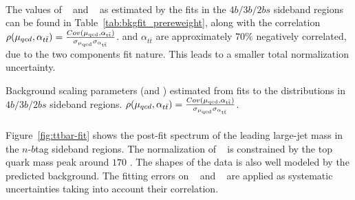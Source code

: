 \paragraph{}
The values of \muqcd~ and \alphatt~ as estimated by the fits in the $4b/3b/2bs$ sideband regions can be found in Table~\ref{tab:bkgfit_prereweight}, along with the correlation $\rho(\mu_{qcd},\alpha_{t\bar{t}}) = \frac{Cov(\rm \mu_{qcd},\rm \alpha_{\rm t\bar{t}})}{\rm \sigma_{\mu_{qcd}} \rm \sigma_{\alpha_{\rm t\bar{t}}} }$. 
\muqcd and $\alpha_{t\bar{t}}$ are approximately $70\%$ negatively correlated, due to the two components fit nature.
This leads to a smaller total normalization uncertainty.

\begin{table}[htbp!]
\begin{center}

\caption{Background scaling parameters (\muqcd and \alphatt) estimated from fits to the \mleadJ distributions in $4b/3b/2bs$ sideband regions. $\rho(\mu_{qcd},\alpha_{t\bar{t}}) = \frac{Cov(\rm \mu_{qcd},\rm \alpha_{\rm t\bar{t}})}{\rm \sigma_{\mu_{qcd}} \rm \sigma_{\alpha_{\rm t\bar{t}}} }$.}
\label{tab:bkgfit_prereweight}
\end{center}
\end{table}

\paragraph{}
Figure~\ref{fig:ttbar-fit} shows the post-fit spectrum of the leading large-\R jet mass in the $n$-$b$tag sideband regions. 
The normalization of \ttbar~ is constrained by the top quark mass peak around $170$ \GeV. 
The shapes of the data is also well modeled by the predicted background. 
The fitting errors on \muqcd~ and \alphatt~ are applied as systematic uncertainties taking into account their correlation.

